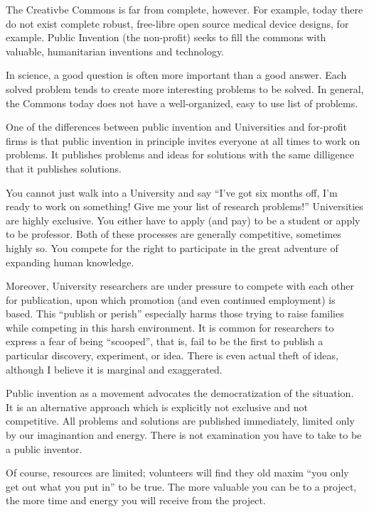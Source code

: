 \documentclass[
	fontsize=10pt, %
	twoside=false, %
	secnumdepth=1, %
]{kaobook}
\begin{document}
The Creativbe Commons is far from complete, however. For example,
today there do not exist complete robust, free-libre
open source medical device designs, for example.
Public Invention (the non-profit) seeks to fill the commons with
valuable, humanitarian inventions and technology.

In science, a good question is often more important
than a good answer. Each solved problem tends to create
more interesting problems to be solved.
In general, the Commons today does not have
a well-organized, easy to use list of problems.

One of the differences between public invention and
Universities and for-profit firms is that public invention in principle
invites everyone at all times to work on problems.
It publishes problems and ideas for solutions with the same
dilligence that it publishes solutions.

You cannot just walk into a University and say ``I've got
six months off, I'm ready to work on something! Give me
your list of research problems!''
Universities are highly exclusive.
You either have to apply (and pay) to be a student or
apply to be professor.
Both of these processes are
generally competitive, sometimes highly so.
You compete for the right to
participate in the great adventure of expanding
human knowledge.

Moreover, University researchers are under pressure
to compete with each other for publication, upon which
promotion (and even continued employment) is based.
This ``publish or perish'' especially harms
those trying to raise families while
competing in this harsh environment.
It is common for researchers to express a fear of
being ``scooped'', that is, fail to be the first
to publish a particular discovery, experiment, or idea.
There is even actual theft of ideas, although I believe
it is marginal and exaggerated.

Public invention as a movement advocates the democratization
of the situation. It is an alternative approach
which is explicitly not exclusive and not competitive.
All problems and solutions are published immediately,
limited only by our imaginantion and energy.
There is not examination you have to take to be
a public inventor.

Of course, resources are limited; volunteers will
find they old maxim ``you only get out what you put in'' to be true.
The more valuable you can be to a project, the more time
and energy you will receive from the project.
\end{document}
